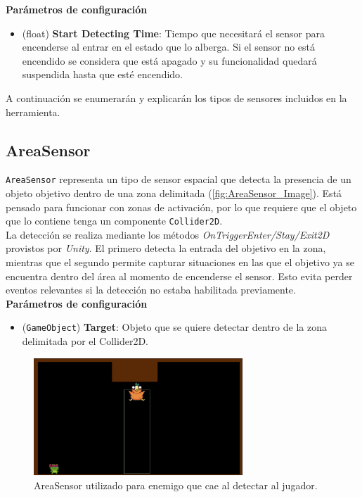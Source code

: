 \textbf{Parámetros de configuración}
\begin{itemize}
	\item (float) \textbf{Start Detecting Time}: Tiempo que necesitará el sensor para encenderse al entrar en el estado que lo alberga. Si el sensor no está encendido se considera que está apagado y su funcionalidad quedará suspendida hasta que esté encendido.
\end{itemize}

A continuación se enumerarán y explicarán los tipos de sensores incluidos en la herramienta.\\

\subsection{AreaSensor}

\texttt{AreaSensor} representa un tipo de sensor espacial que detecta la presencia de un objeto objetivo dentro de una zona delimitada (\autoref{fig:AreaSensor_Image}). Está pensado para funcionar con zonas de activación, por lo que requiere que el objeto que lo contiene tenga un componente \texttt{Collider2D}.\\

La detección se realiza mediante los métodos \textit{OnTriggerEnter/Stay/Exit2D} provistos por \textit{Unity}. 
El primero detecta la entrada del objetivo en la zona, mientras que el segundo permite capturar situaciones en las que el objetivo ya se encuentra dentro del área al momento de encenderse el sensor. Esto evita perder eventos relevantes si la detección no estaba habilitada previamente.\\

\textbf{Parámetros de configuración}
\begin{itemize}
	\item (\texttt{GameObject}) \textbf{Target}: Objeto que se quiere detectar dentro de la zona delimitada por el Collider2D.
\end{itemize}

\begin{figure}[t]
		\centering
		\includegraphics[width = 0.7\textwidth]{Imagenes/AreaSensor_Image.png}
		\caption{AreaSensor utilizado para enemigo que cae al detectar al jugador.}
		\label{fig:AreaSensor_Image}
\end{figure}
